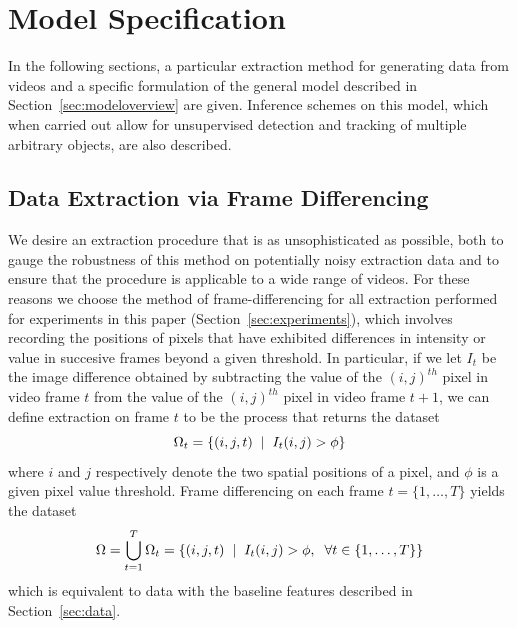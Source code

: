 \documentclass[smallcondensed, final]{svjour3}
\begin{document}

\section{Model Specification}
\label{sec:modelspec}

In the following sections, a particular extraction method for generating data from videos and a specific formulation of the general model described in Section~\ref{sec:modeloverview} are given. Inference schemes on this model, which when carried out allow for unsupervised detection and tracking of multiple arbitrary objects, are also described.






\subsection{Data Extraction via Frame Differencing}
\label{sec:modelspec_extraction}

We desire an extraction procedure that is as unsophisticated as possible, both to gauge the robustness of this method on potentially noisy extraction data and to ensure that the procedure is applicable to a wide range of videos. For these reasons we choose the method of frame-differencing for all extraction performed for experiments in this paper (Section~\ref{sec:experiments}), which involves recording the positions of pixels that have exhibited differences in intensity or value in succesive frames beyond a given threshold. In particular, if we let $I_{t}$ be the image difference obtained by subtracting the value of the $(i,j)^{th}$ pixel in video frame $t$ from the value of the $(i,j)^{th}$ pixel in video frame $t+1$, we can define extraction on frame $t$ to be the process that returns the dataset
\begin{equation}
	\Omega_{t} = \{ (i,j,t) \hspace{2mm} | \hspace{2mm} I_{t}(i,j) > \phi \}
\end{equation}
where $i$ and $j$ respectively denote the two spatial positions of a pixel, and $\phi$ is a given pixel value threshold. Frame differencing on each frame $t =\{1, \ldots, T \}$ yields the dataset
\begin{equation}
	\Omega = \bigcup_{t=1}^{T} \Omega_{t} = \{ (i,j,t) \hspace{2mm} | \hspace{2mm} I_{t}(i,j) > \phi,  \hspace{2mm}  \forall t \in \{1, \ldots, T \} \}
\end{equation}
which is equivalent to data with the baseline features described in Section~\ref{sec:data}.
\end{document}
